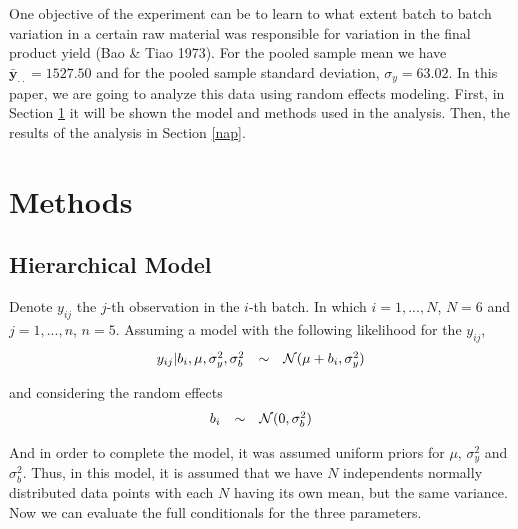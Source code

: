 \documentclass{asaproc}
\begin{document}
One objective of the experiment can be to learn to what extent batch to batch variation in a certain raw material was responsible for variation in the final product yield  (Bao \& Tiao 1973). For the pooled sample mean we have $\bar{\boldsymbol{y}}_{\cdot\cdot} = 1527.50$ and for the pooled sample standard deviation, $\sigma_y = 63.02$. In this paper, we are going to analyze this data using random effects modeling. First, in Section \ref{method} it will be shown the model and methods used in the analysis. Then, the results of the analysis in Section \ref{nap}.

\section{Methods} \label{method}

\subsection{Hierarchical Model} 

Denote $y_{ij}$ the $j$-th observation in the $i$-th batch. In which $i = 1, ..., N$, $N=6$ and $j = 1, ..., n$, $n = 5$. Assuming a model with the following likelihood for the $y_{ij}$, 
\begin{eqnarray*}
\begin{array}{lcl ll }
y_{ij}|b_i,\mu, \sigma_y^2, \sigma_b^2 & \sim & \mathcal{N} (\mu + b_i, \sigma^2_y) 
\end{array}
\end{eqnarray*}

and considering the random effects
\begin{eqnarray*}
\begin{array}{lcl ll }
b_i & \sim & \mathcal{N} (0, \sigma^2_b) 
\end{array}
\end{eqnarray*}

And in order to complete the model, it was assumed uniform priors for $\mu$, $\sigma^2_y$ and $\sigma^2_b$. Thus, in this model, it is assumed that we have $N$ independents normally distributed data points with each $N$ having its own mean, but the same variance. Now we can evaluate the full conditionals for the three parameters.
\end{document}
